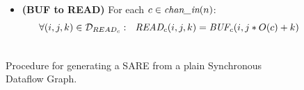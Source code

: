 \begin{figure}[ht]
{\begin{minipage}{5.5in}
\begin{itemize}
\begin{align}
  \mt{WRITE}_{c}(i, q, j - q * U(c)) \\ \nonumber
&\mt{where } {\cal D}_{W \rightarrow B}(c,q) = 
  {\cal D}_{{BUF}_{c}} \cap 
  \{ (i,j)~|~q*U(c) \le j \le (q+1)*U(c) - 1 \}
\end{align}
\item {\bf(BUF to READ)} For each $c \in \mbox{\it chan\_in}(n)$:
\begin{align}
\label{eq:b2r}
&~~~~~\forall (i,j,k) \in {\cal D}_{READ_{c}}:~~
\mbox{\it READ}_{c}(i,j,k) = \mbox{\it BUF}_{c}(i,j*O(c) + k) \\ \nonumber
\end{align}
\vspace{-12pt}
\end{itemize}
\end{minipage}}
\caption{Procedure for generating a SARE from a plain Synchronous
Dataflow Graph.  \protect\label{fig:sdftosare}}
\end{figure}

